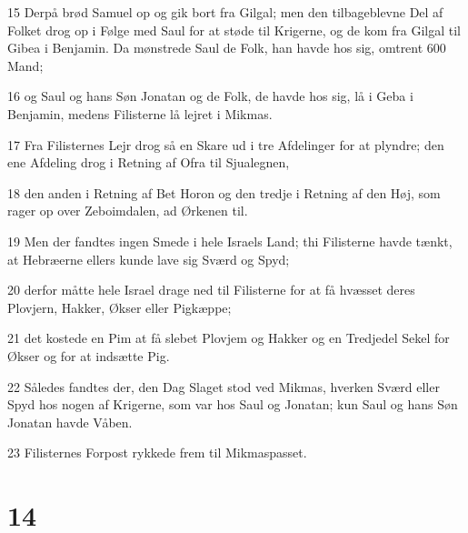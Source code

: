 \par 15 Derpå brød Samuel op og gik bort fra Gilgal; men den tilbageblevne Del af Folket drog op i Følge med Saul for at støde til Krigerne, og de kom fra Gilgal til Gibea i Benjamin. Da mønstrede Saul de Folk, han havde hos sig, omtrent 600 Mand;
\par 16 og Saul og hans Søn Jonatan og de Folk, de havde hos sig, lå i Geba i Benjamin, medens Filisterne lå lejret i Mikmas.
\par 17 Fra Filisternes Lejr drog så en Skare ud i tre Afdelinger for at plyndre; den ene Afdeling drog i Retning af Ofra til Sjualegnen,
\par 18 den anden i Retning af Bet Horon og den tredje i Retning af den Høj, som rager op over Zeboimdalen, ad Ørkenen til.
\par 19 Men der fandtes ingen Smede i hele Israels Land; thi Filisterne havde tænkt, at Hebræerne ellers kunde lave sig Sværd og Spyd;
\par 20 derfor måtte hele Israel drage ned til Filisterne for at få hvæsset deres Plovjern, Hakker, Økser eller Pigkæppe;
\par 21 det kostede en Pim at få slebet Plovjem og Hakker og en Tredjedel Sekel for Økser og for at indsætte Pig.
\par 22 Således fandtes der, den Dag Slaget stod ved Mikmas, hverken Sværd eller Spyd hos nogen af Krigerne, som var hos Saul og Jonatan; kun Saul og hans Søn Jonatan havde Våben.
\par 23 Filisternes Forpost rykkede frem til Mikmaspasset.

\chapter{14}

